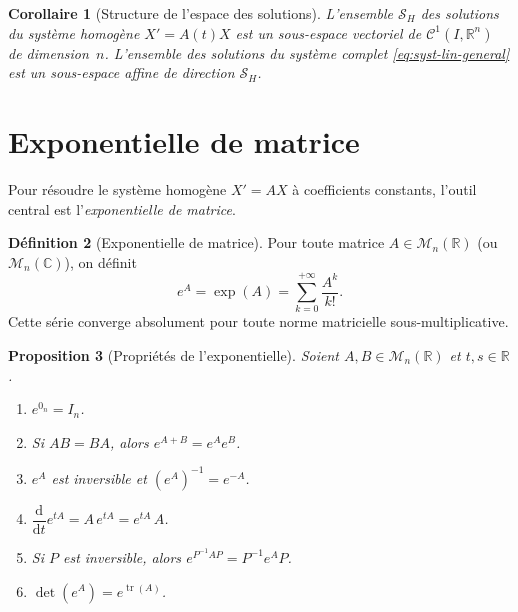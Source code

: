 \documentclass[12pt,a4paper,openany]{book}
\theoremstyle{definition}
\newtheorem{definition}{Définition}[chapter]
\theoremstyle{plain}
\newtheorem{proposition}[definition]{Proposition}
\newtheorem{corollaire}[definition]{Corollaire}
\theoremstyle{remark}
\newcommand{\R}{\mathbb{R}}
\newcommand{\C}{\mathbb{C}}
\newcommand{\dd}{\mathrm{d}}
\DeclareMathOperator{\tr}{tr}
\begin{document}
\begin{corollaire}[Structure de l'espace des solutions]\label{cor:structure-solutions-syst}
  L'ensemble $\mathcal{S}_H$ des solutions du système homogène
  $X' = A(t)X$ est un sous-espace vectoriel de $\mathcal{C}^1(I,\R^n)$
  de dimension~$n$. L'ensemble des solutions du système complet
  \eqref{eq:syst-lin-general} est un sous-espace affine de direction
  $\mathcal{S}_H$.
\end{corollaire}

\section{Exponentielle de matrice}\label{sec:exp-matrice}

Pour résoudre le système homogène $X' = AX$ à coefficients constants,
l'outil central est l'\emph{exponentielle de matrice}.

\begin{definition}[Exponentielle de matrice]\label{def:exp-matrice}
  Pour toute matrice $A \in \mathcal{M}_n(\R)$ (ou $\mathcal{M}_n(\C)$),
  on définit
  \begin{equation}\label{eq:exp-matrice}
    e^A = \exp(A) = \sum_{k=0}^{+\infty} \frac{A^k}{k!}.
  \end{equation}
  Cette série converge absolument pour toute norme matricielle
  sous-multiplicative.
\end{definition}

\begin{proposition}[Propriétés de l'exponentielle]\label{prop:proprietes-exp}
  Soient $A, B \in \mathcal{M}_n(\R)$ et $t, s \in \R$.
  \begin{enumerate}[label=(\roman*)]
    \item $e^{0_n} = I_n$.
    \item Si $AB = BA$, alors $e^{A+B} = e^A e^B$.
    \item $e^A$ est inversible et $(e^A)^{-1} = e^{-A}$.
    \item $\dfrac{\dd}{\dd t} e^{tA} = A\,e^{tA} = e^{tA}\,A$.
    \item Si $P$ est inversible, alors $e^{P^{-1}AP} = P^{-1} e^A P$.
    \item $\det(e^A) = e^{\tr(A)}$.
  \end{enumerate}
\end{proposition}
\end{document}
